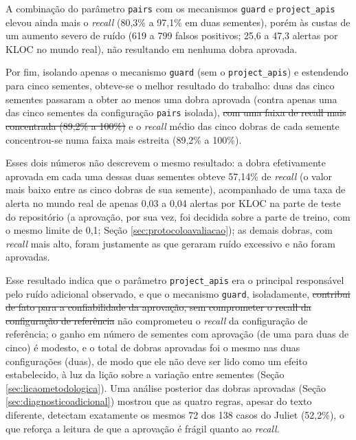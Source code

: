 \documentclass[
    12pt,                %
    openright,           %
    oneside,             %
    a4paper,             %
    english,             %
    brazil               %
]{abntex2}
\newcommand{\antigo}[1]{\sout{#1}}
\newcommand{\novo}[1]{{\color{red}#1}}
\begin{document}
\par
A combinação do parâmetro \texttt{pairs} com os mecanismos \texttt{guard} e \texttt{project\_apis} elevou ainda mais o \textit{recall} (80,3\% a 97,1\% em duas sementes), porém às custas de um aumento severo de ruído (619 a 799 falsos positivos; 25,6 a 47,3 alertas por KLOC no mundo real), não resultando em nenhuma dobra aprovada.
\par
Por fim, isolando apenas o mecanismo \texttt{guard} (sem o \texttt{project\_apis}) e estendendo para cinco sementes, obteve-se o melhor resultado do trabalho: duas das cinco sementes passaram a obter ao menos uma dobra aprovada (contra apenas uma das cinco sementes da configuração \texttt{pairs} isolada), \antigo{com uma faixa de recall mais concentrada (89,2\% a 100\%)} \novo{e o \textit{recall} médio das cinco dobras de cada semente concentrou-se numa faixa mais estreita (89,2\% a 100\%)}.
\par
\novo{Esses dois números não descrevem o mesmo resultado: a dobra efetivamente aprovada em cada uma dessas duas sementes obteve 57,14\% de \textit{recall} (o valor mais baixo entre as cinco dobras de sua semente), acompanhado de uma taxa de alerta no mundo real de apenas 0,03 a 0,04 alertas por KLOC na parte de teste do repositório (a aprovação, por sua vez, foi decidida sobre a parte de treino, com o mesmo limite de 0,1; Seção \ref{sec:protocoloavaliacao}); as demais dobras, com \textit{recall} mais alto, foram justamente as que geraram ruído excessivo e não foram aprovadas.}
\par
Esse resultado indica que o parâmetro \texttt{project\_apis} era o principal responsável pelo ruído adicional observado, e que o mecanismo \texttt{guard}, isoladamente, \antigo{contribui de fato para a confiabilidade da aprovação, sem comprometer o recall da configuração de referência} \novo{não comprometeu o \textit{recall} da configuração de referência; o ganho em número de sementes com aprovação (de uma para duas de cinco) é modesto, e o total de dobras aprovadas foi o mesmo nas duas configurações (duas), de modo que ele não deve ser lido como um efeito estabelecido, à luz da lição sobre a variação entre sementes (Seção \ref{sec:licaometodologica})}. \novo{Uma análise posterior das dobras aprovadas (Seção \ref{sec:diagnosticoadicional}) mostrou que as quatro regras, apesar do texto diferente, detectam exatamente os mesmos 72 dos 138 casos do Juliet (52,2\%), o que reforça a leitura de que a aprovação é frágil quanto ao \textit{recall}.}
\end{document}

